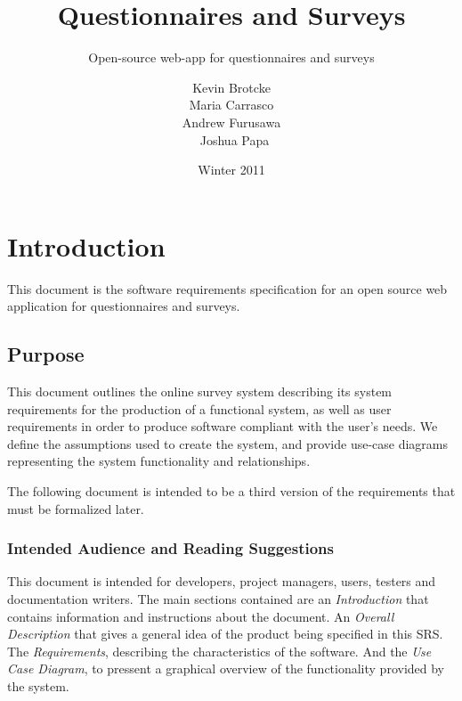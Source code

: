 \documentclass[a4paper,12pt,oneside]{report}
\title{Questionnaires and Surveys}
\subtitle{Open-source web-app for questionnaires and surveys}
\date{Winter 2011}
\author{Kevin Brotcke\\
Maria Carrasco\\
Andrew Furusawa\\\
Joshua Papa }
\begin{document}
   
\renewcommand{\contentsname}{Contents}
\renewcommand{\bibname}{Bibliography}
\renewcommand{\caption}{{\bf Caption : }}

\raskolnikovmaketitle
\tableofcontents

\chapter{Introduction}
This document is the software requirements specification for an open source web application for questionnaires and surveys.

\section{Purpose}
This document outlines the online survey system describing its system requirements for the production of  a functional system, as well as user requirements in order to produce software compliant with the user's needs. We define the assumptions used to create the system, and provide use-case diagrams representing the system functionality and relationships.

The following  document is intended to be a third version of the requirements that must be formalized later. 

\subsection{Intended Audience and Reading Suggestions}
This document is intended for developers, project managers, users, testers and documentation writers. The main sections contained are an {\it Introduction} that contains information and instructions about the document. An {\it Overall Description} that gives a general idea of the product being specified in this SRS. The {\it Requirements}, describing the characteristics of the software. And the {\it Use Case Diagram}, to pressent a graphical overview of the functionality provided by the system.
\end{document}
